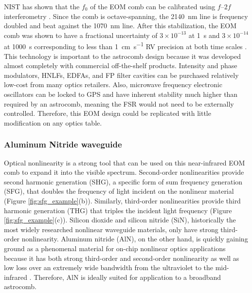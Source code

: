 \documentclass[11pt]{article}
\begin{document}
NIST has shown that the $f_0$ of the EOM comb can be calibrated using $f$--$2f$ interferometry \citep{Beha2017}. Since the comb is octave-spanning, the \SI{2140}{\nano\meter} line is frequency doubled and beat against the \SI{1070}{\nano\meter} line. After this stabilization, the EOM comb was shown to have a fractional uncertainty of $3 \times 10^{-13}$ at \SI{1}{\second} and $3 \times 10^{-14}$ at \SI{1000}{\second} corresponding to less than \SI{1}{\centi\meter\per\second} RV precision at both time scales \citep{Beha2017}. This technology is important to the astrocomb design because it was developed almost completely with commercial off-the-shelf products. Intensity and phase modulators, HNLFs, EDFAs, and FP filter cavities can be purchased relatively low-cost from many optics retailers. Also, microwave frequency electronic oscillators can be locked to GPS and have inherent stability much higher than required by an astrocomb, meaning the FSR would not need to be externally controlled. Therefore, this EOM design could be replicated with little modification on any optics table.

\subsubsection{Aluminum Nitride waveguide}

Optical nonlinearity is a strong tool that can be used on this near-infrared EOM comb to expand it into the visible spectrum. Second-order nonlinearities provide second harmonic generation (SHG), a specific form of sum frequency generation (SFG), that doubles the frequency of light incident on the nonlinear material (Figure \ref{fig:sfg_example}(b)). Similarly, third-order nonlinearities provide third harmonic generation (THG) that triples the incident light frequency (Figure \ref{fig:sfg_example}(c)). Silicon dioxide and silicon nitride (SiN), historically the most widely researched nonlinear waveguide materials, only have strong third-order nonlinearity. Aluminum nitride (AlN), on the other hand, is quickly gaining ground as a phenomenal material for on-chip nonlinear optics applications because it has both strong third-order and second-order nonlinearity as well as low loss over an extremely wide bandwidth from the ultraviolet to the mid-infrared \citep{Jung2016}. Therefore, AlN is ideally suited for application to a broadband astrocomb.
\end{document}
